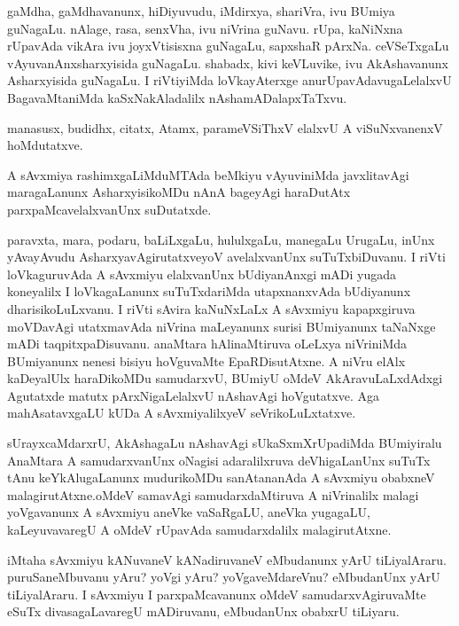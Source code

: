 \begin{mng}
gaMdha, gaMdhavanunx, hiDiyuvudu, iMdirxya, shariVra, ivu BUmiya guNagaLu. nAlage, rasa, senxVha, ivu niVrina guNavu. rUpa, kaNiNxna rUpavAda vikAra ivu joyxVtisisxna guNagaLu, sapxshaR pArxNa. ceVSeTxgaLu vAyuvanAnxsharxyisida guNagaLu. shabadx, kivi keVLuvike, ivu AkAshavanunx  Asharxyisida guNagaLu. I riVtiyiMda loVkayAterxge anurUpavAdavugaLelalxvU BagavaMtaniMda kaSxNakAladalilx nAshamADalapxTaTxvu.
\end{mng}

\begin{mng}
manasusx, budidhx, citatx, Atamx, parameVSiThxV elalxvU A viSuNxvanenxV hoMdutatxve.
\end{mng}

\begin{mng}
A sAvxmiya rashimxgaLiMduMTAda beMkiyu vAyuviniMda javxlitavAgi maragaLanunx AsharxyisikoMDu nAnA bageyAgi haraDutAtx parxpaMcavelalxvanUnx suDutatxde.
\end{mng}

\begin{mng}
paravxta, mara, podaru, baLiLxgaLu, hululxgaLu, manegaLu UrugaLu, inUnx yAvayAvudu AsharxyavAgirutatxveyoV avelalxvanUnx suTuTxbiDuvanu. I riVti loVkaguruvAda A sAvxmiyu elalxvanUnx bUdiyanAnxgi mADi yugada koneyalilx I loVkagaLanunx suTuTxdariMda utapxnanxvAda bUdiyanunx dharisikoLuLxvanu. I riVti sAvira kaNuNxLaLx A sAvxmiyu kapapxgiruva moVDavAgi utatxmavAda niVrina maLeyanunx surisi BUmiyanunx taNaNxge mADi taqpitxpaDisuvanu. anaMtara hAlinaMtiruva oLeLxya niVriniMda BUmiyanunx nenesi bisiyu hoVguvaMte EpaRDisutAtxne. A niVru elAlx kaDeyalUlx haraDikoMDu samudarxvU, BUmiyU oMdeV AkAravuLaLxdAdxgi Agutatxde matutx pArxNigaLelalxvU nAshavAgi hoVgutatxve. Aga mahAsatavxgaLU kUDa A sAvxmiyalilxyeV seVrikoLuLxtatxve.
\end{mng}

\begin{mng}
sUrayxcaMdarxrU, AkAshagaLu nAshavAgi sUkaSxmXrUpadiMda BUmiyiralu AnaMtara A samudarxvanUnx oNagisi adaralilxruva deVhigaLanUnx suTuTx tAnu keYkAlugaLanunx mudurikoMDu sanAtananAda A sAvxmiyu obabxneV malagirutAtxne.oMdeV samavAgi samudarxdaMtiruva A niVrinalilx malagi yoVgavanunx A sAvxmiyu aneVke vaSaRgaLU, aneVka yugagaLU, kaLeyuvavaregU A oMdeV rUpavAda samudarxdalilx malagirutAtxne.
\end{mng}

\begin{mng}
iMtaha sAvxmiyu kANuvaneV kANadiruvaneV eMbudanunx yArU tiLiyalAraru. puruSaneMbuvanu yAru? yoVgi yAru? yoVgaveMdareVnu? eMbudanUnx yArU tiLiyalAraru. I sAvxmiyu I parxpaMcavanunx oMdeV samudarxvAgiruvaMte eSuTx divasagaLavaregU mADiruvanu, eMbudanUnx obabxrU tiLiyaru.
\end{mng}

